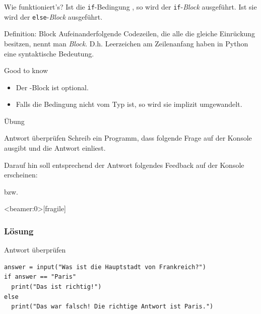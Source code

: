 \begin{frame}
\begin{block}{Wie funktioniert's?}
	\vspace{2pt}
Ist die \texttt{if}-Bedingung , so wird der \texttt{if}-\textit{Block} ausgeführt. Ist sie  wird der \texttt{else}-\textit{Block} ausgeführt. 
\end{block}
\pause

\vspace{10pt}
	\begin{block}{Definition: Block}
		\vspace{2pt}
		Aufeinanderfolgende Codezeilen, die alle die gleiche Einrückung besitzen, nennt man \emph{Block}. 
		D.h. Leerzeichen am Zeilenanfang haben in Python eine syntaktische Bedeutung.  
	\end{block}


\pause 
\vspace{10pt}

\begin{block}{Good to know}
	\begin{itemize}
		\item Der -Block ist optional.
		\item Falls die Bedingung nicht vom Typ  ist, so wird sie implizit umgewandelt.  
	\end{itemize}
\end{block}
\end{frame}

\begin{frame}{Übung}

\begin{block}{Antwort überprüfen}
	\vspace{2pt}
	Schreib ein Programm, dass folgende Frage auf der Konsole ausgibt und die Antwort einliest. 
	
	
	Darauf hin soll entsprechend der Antwort folgendes Feedback auf der Konsole erscheinen: 
	
	
	bzw. 

	
\end{block}
\end{frame}

\begin{frame}<beamer:0>[fragile]
\frametitle{Lösung}
\begin{solutionblock}{Antwort überprüfen}
\begin{verbatim}
answer = input("Was ist die Hauptstadt von Frankreich?")
if answer == "Paris"
  print("Das ist richtig!")
else 
  print("Das war falsch! Die richtige Antwort ist Paris.")
\end{verbatim}
\end{solutionblock}
\end{frame}


